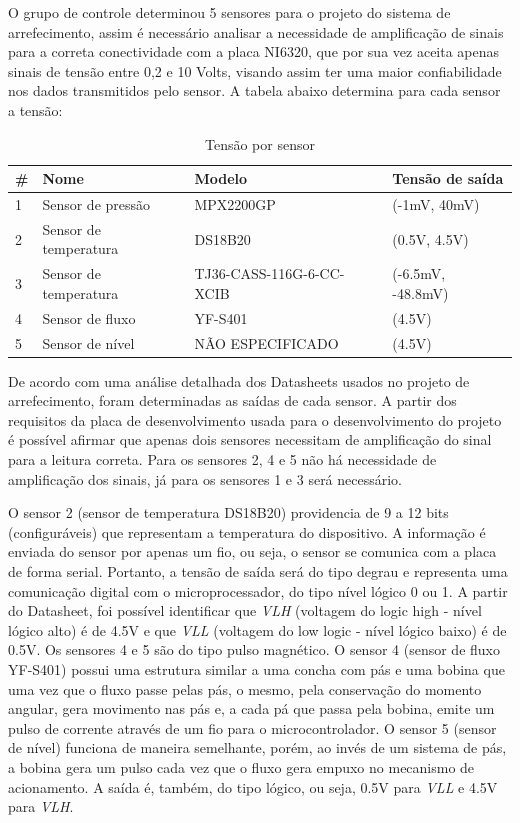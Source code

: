 O grupo de controle determinou 5 sensores para o projeto do sistema de arrefecimento, assim é necessário analisar a necessidade de amplificação de sinais para a correta conectividade com a placa NI6320, que por sua vez aceita apenas sinais de tensão entre 0,2 e 10 Volts, visando assim ter uma maior confiabilidade nos dados transmitidos pelo sensor.
A tabela abaixo determina para cada sensor a tensão:

\begin{table}[]
    \centering
    \begin{tabular}{|p{3cm}|p{5cm}|p{3cm}|p{3cm}|}
    \hline
    \textbf{\#} & \textbf{Nome}    & \textbf{Modelo} & \textbf{Tensão de saída} \\ \hline
    1      & Sensor de pressão & MPX2200GP  & (-1mV, 40mV)  \\ \hline
    2 & Sensor de temperatura & DS18B20 & (0.5V, 4.5V) \\ \hline
    3 & Sensor de temperatura & TJ36-CASS-116G-6-CC-XCIB & (-6.5mV, -48.8mV) \\ \hline
    4 & Sensor de fluxo & YF-S401 & (4.5V) \\ \hline
    5 & Sensor de nível & NÃO ESPECIFICADO & (4.5V) \\ \hline
    \end{tabular}
    \caption{Tensão por sensor}
    \end{table}

De acordo com uma análise detalhada dos Datasheets usados no projeto de arrefecimento, foram determinadas as saídas de cada sensor. A partir dos requisitos da placa de desenvolvimento usada para o desenvolvimento do projeto é possível afirmar que apenas dois sensores necessitam de amplificação do sinal para a leitura correta. Para os sensores 2, 4 e 5 não há necessidade de amplificação dos sinais, já para os sensores 1 e 3 será necessário. 

O sensor 2 (sensor de temperatura DS18B20) providencia de 9 a 12 bits (configuráveis) que representam a temperatura do dispositivo. A informação é enviada do sensor por apenas um fio, ou seja, o sensor se comunica com a placa de forma serial. Portanto, a tensão de saída será do tipo degrau e representa uma comunicação digital com o microprocessador, do tipo nível lógico 0 ou 1. A partir do Datasheet, foi possível identificar que \textit{VLH} (voltagem do logic high - nível lógico alto) é de 4.5V e que \textit{VLL} (voltagem do low logic - nível lógico baixo) é de 0.5V.
Os sensores 4 e 5 são do tipo pulso magnético. O sensor 4 (sensor de fluxo YF-S401) possui uma estrutura similar a uma concha com pás e uma bobina que uma vez que o fluxo passe pelas pás, o mesmo, pela conservação do momento angular, gera movimento nas pás e, a cada pá que passa pela bobina, emite um pulso de corrente através de um fio para o microcontrolador. O sensor 5 (sensor de nível) funciona de maneira semelhante, porém, ao invés de um sistema de pás, a bobina gera um pulso cada vez que o fluxo gera empuxo no mecanismo de acionamento. A saída é, também, do tipo lógico, ou seja, 0.5V para \textit{VLL} e 4.5V para \textit{VLH}.


